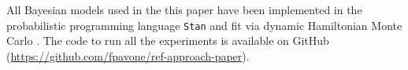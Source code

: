 \documentclass[american,]{article}
\theoremstyle{definition}
\begin{document}
All Bayesian models used in the this paper have been implemented in
the probabilistic programming language \texttt{Stan}
\citep{paper:stan} and fit via dynamic Hamiltonian Monte Carlo
\citep{hoffman2014no,betancourt2017conceptual}. The code to run all
the experiments is available on GitHub
(\url{https://github.com/fpavone/ref-approach-paper}).




 




\end{document}
